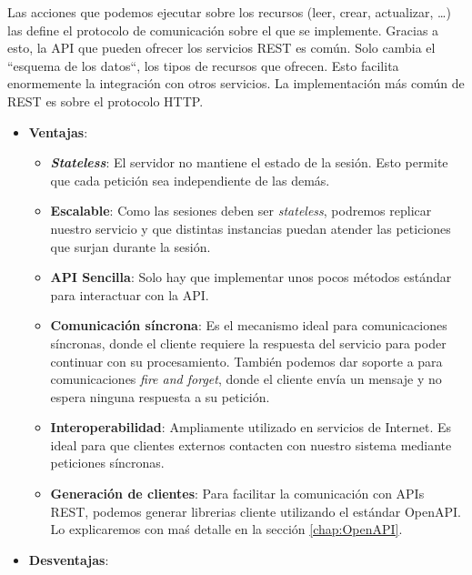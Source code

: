 \begin{itemize}
  Las acciones que podemos ejecutar sobre los recursos (leer, crear, actualizar, \dots) las define el protocolo de comunicación sobre el que se implemente. Gracias a esto, la API que pueden ofrecer los servicios REST es común. Solo cambia el ``esquema de los datos``, los tipos de recursos que ofrecen. Esto facilita enormemente la integración con otros servicios. \cite{nallyRESTVsRPC2018} La implementación más común de REST es sobre el protocolo HTTP.

  \begin{itemize}
    \item \textbf{Ventajas}:

    \begin{itemize}
      \item \textbf{\emph{Stateless}}: El servidor no mantiene el estado de la sesión. Esto permite que cada petición sea independiente de las demás.

      \item \textbf{Escalable}: Como las sesiones deben ser \emph{stateless}, podremos replicar nuestro servicio y que distintas instancias puedan atender las peticiones que surjan durante la sesión.

      \item \textbf{API Sencilla}: Solo hay que implementar unos pocos métodos estándar para interactuar con la API.

      \item \textbf{Comunicación síncrona}: Es el mecanismo ideal para comunicaciones síncronas, donde el cliente requiere la respuesta del servicio para poder continuar con su procesamiento. También podemos dar soporte a para comunicaciones \emph{fire and forget}, donde el cliente envía un mensaje y no espera ninguna respuesta a su petición.

      \item \textbf{Interoperabilidad}: Ampliamente utilizado en servicios de Internet. Es ideal para que clientes externos contacten con nuestro sistema mediante peticiones síncronas. \cite{newmanBuildingMicroservicesDesigning2021}

      \item \textbf{Generación de clientes}: Para facilitar la comunicación con APIs REST, podemos generar librerias cliente utilizando el estándar OpenAPI. Lo explicaremos con maś detalle en la sección \ref{chap:OpenAPI}.
    \end{itemize}

    \item \textbf{Desventajas}:


\end{itemize}
\end{itemize}
